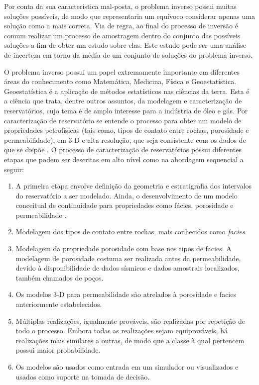 Por conta da sua característica mal-posta, o problema inverso
possui muitas soluções possíveis, de modo que representaria um equívoco considerar apenas
uma solução como a mais correta. Via de regra, ao final do processo de inversão é comum
realizar um processo de amostragem dentro do conjunto das possíveis soluções a fim
de obter um estudo sobre elas. Este estudo pode ser uma análise de 
incerteza em torno da média de um conjunto de soluções do problema inverso.

O problema inverso possui um papel extremamente importante em diferentes áreas do conhecimento
como Matemática, Medicina, Física e Geoestatística. Geoestatística é a aplicação de métodos
estatísticos nas ciências da terra. Esta é a ciência que trata, dentre outros assuntos, da modelagem
e caracterização de reservatórios, cujo tema é de amplo interesse para a indústria de óleo
e gás. Por caracterização de reservatório se entende o processo para obter um modelo de propriedades
petrofísicas (tais como, tipos de contato entre rochas, porosidade e permeabilidade),
em 3-D e alta resolução, que seja consistente com os dados de que se dispõe \cite{deutsch2002}.
O processo de caracterização de reservatórios possui diferentes
etapas que podem ser descritas em alto nível como na abordagem sequencial a seguir:
\begin{enumerate}
 \item A primeira etapa envolve definição da geometria e estratigrafia dos intervalos do reservatório
 a ser modelado. Ainda, o desenvolvimento de um modelo conceitual de continuidade para
 propriedades como fácies, porosidade e permeabilidade \label{itm:1}.
 \item Modelagem dos tipos de contato entre rochas, mais conhecidos como \textit{facies}\label{itm:2}.
 \item Modelagem da propriedade porosidade com base nos tipos de facies. A modelagem de porosidade
 costuma ser realizada antes da permeabilidade, devido à disponibilidade de dados sísmicos e dados
 amostrais localizados, também chamados de poços\label{itm:3}.
 \item Os modelos 3-D para permeabilidade são atrelados à porosidade e facies anteriormente estabelecidos\label{itm:4}.
 \item Múltiplas realizações, igualmente prováveis, são realizadas por repetição de todo o processo. Embora todas as
 realizações sejam equiprováveis, há realizações mais similares a outras, de modo que a classe à qual pertencem possui
 maior probabilidade\label{itm:5}.
 \item Os modelos são usados como entrada em um simulador ou visualizados e usados como suporte na tomada de decisão\label{itm:6}.
\end{enumerate}

